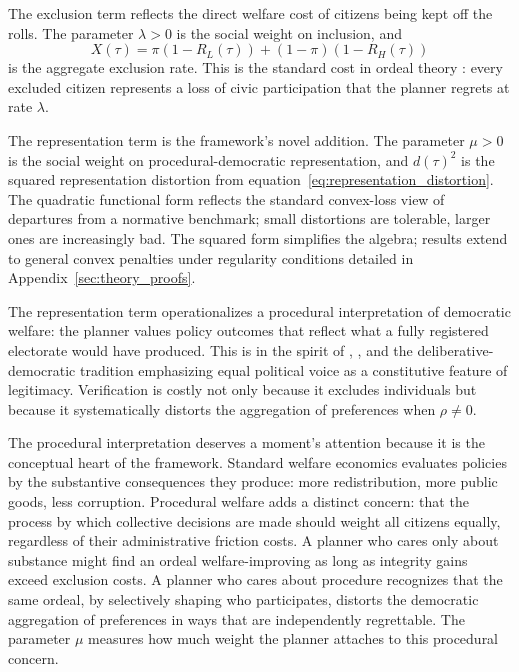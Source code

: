 The exclusion term reflects the direct welfare cost of citizens being kept off the rolls. The parameter $\lambda > 0$ is the social weight on inclusion, and
\[
X(\tau) = \pi(1 - R_L(\tau)) + (1-\pi)(1-R_H(\tau))
\]
is the aggregate exclusion rate. This is the standard cost in ordeal theory \citep{NicholsZeckhauser1982, Alatas2016}: every excluded citizen represents a loss of civic participation that the planner regrets at rate $\lambda$.

The representation term is the framework's novel addition. The parameter $\mu > 0$ is the social weight on procedural-democratic representation, and $d(\tau)^2$ is the squared representation distortion from equation~\eqref{eq:representation_distortion}. The quadratic functional form reflects the standard convex-loss view of departures from a normative benchmark; small distortions are tolerable, larger ones are increasingly bad. The squared form simplifies the algebra; results extend to general convex penalties under regularity conditions detailed in Appendix~\ref{sec:theory_proofs}.

The representation term operationalizes a procedural interpretation of democratic welfare: the planner values policy outcomes that reflect what a fully registered electorate would have produced. This is in the spirit of \citet{Kolm1977}, \citet{Sen1985}, and the deliberative-democratic tradition emphasizing equal political voice as a constitutive feature of legitimacy. Verification is costly not only because it excludes individuals but because it systematically distorts the aggregation of preferences when $\rho \neq 0$.

The procedural interpretation deserves a moment's attention because it is the conceptual heart of the framework. Standard welfare economics evaluates policies by the substantive consequences they produce: more redistribution, more public goods, less corruption. Procedural welfare adds a distinct concern: that the process by which collective decisions are made should weight all citizens equally, regardless of their administrative friction costs. A planner who cares only about substance might find an ordeal welfare-improving as long as integrity gains exceed exclusion costs. A planner who cares about procedure recognizes that the same ordeal, by selectively shaping who participates, distorts the democratic aggregation of preferences in ways that are independently regrettable. The parameter $\mu$ measures how much weight the planner attaches to this procedural concern.

